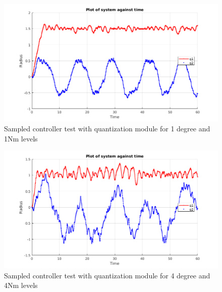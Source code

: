 \documentclass[a4paper,12pt,oneside,onecolumn]{article} %
\begin{document}
\begin{figure}[ht]
    \centering
    \includegraphics[scale=0.4]{quant2_1_1.png}
    \caption{Sampled controller test with quantization module for 1 degree and 1Nm levels}
    \label{fig:10}
\end{figure} 

\begin{figure}[ht]
    \centering
    \includegraphics[scale=0.4]{quant2_2_2.png}
    \caption{Sampled controller test with quantization module for 4 degree and 4Nm levels}
    \label{fig:11}
\end{figure}  
\end{document}

